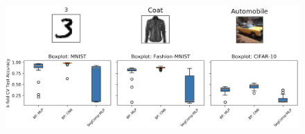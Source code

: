 \documentclass[dvipsnames, usenames]{beamer}
\begin{document}

\begin{frame}[noframenumbering]
	\begin{figure}
		\centering
		\includegraphics[width=\textwidth]{../figures/report/p3_2}
	\end{figure}
\end{frame}
\end{document}
